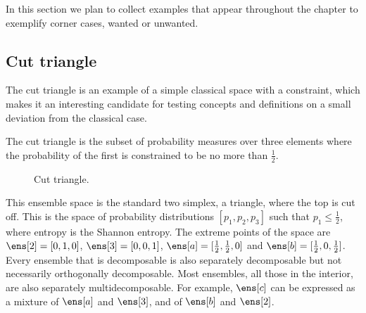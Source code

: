 In this section we plan to collect examples that appear throughout the chapter to exemplify corner cases, wanted or unwanted.

\subsection{Cut triangle}

The cut triangle is an example of a simple classical space with a constraint, which makes it an interesting candidate for testing concepts and definitions on a small deviation from the classical case.

\begin{example}\label{pm-es-cutTriangle}
	The cut triangle is the subset of probability measures over three elements where the probability of the first is constrained to be no more than $\frac{1}{2}$.
\end{example}

\begin{figure}[H]
	\centering
	\caption{Cut triangle.}\label{pm-es-fig-cutTriangle}
\end{figure}

This ensemble space is the standard two simplex, a triangle, where the top is cut off. This is the space of probability distributions $[p_1, p_2, p_3]$ such that $p_1 \leq \frac{1}{2}$, where entropy is the Shannon entropy. The extreme points of the space are $\ens[2] = [0,1,0]$, $\ens[3] = [0,0,1]$, $\ens[a] = [\frac{1}{2},\frac{1}{2},0]$ and $\ens[b] = [\frac{1}{2},0,\frac{1}{2}]$. Every ensemble that is decomposable is also separately decomposable but not necessarily orthogonally decomposable. Most ensembles, all those in the interior, are also separately multidecomposable. For example, $\ens[c]$ can be expressed as a mixture of $\ens[a]$ and $\ens[3]$, and of $\ens[b]$ and $\ens[2]$.

